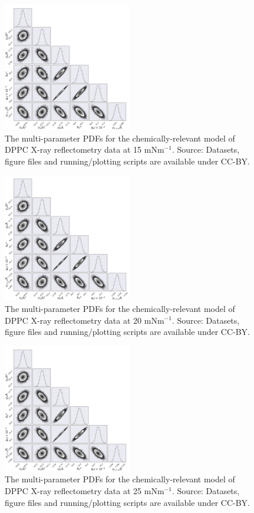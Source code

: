 \documentclass[11pt,a4paper]{article}
\begin{document}
\begin{figure}[h]
	\centering
	\includegraphics[width=0.50\textwidth]{figures/dppc2_all_corner}
	\caption{The multi-parameter PDFs for the chemically-relevant model of DPPC X-ray reflectometry data at 15 mNm$^{-1}$. Source: Datasets, figure files and running/plotting scripts are available under CC-BY.\cite{mccluskey_2018}}
	\label{fig:dppc2}
\end{figure}
\begin{figure}[h]
	\centering
	\includegraphics[width=0.50\textwidth]{figures/dppc3_all_corner}
	\caption{The multi-parameter PDFs for the chemically-relevant model of DPPC X-ray reflectometry data at 20 mNm$^{-1}$. Source: Datasets, figure files and running/plotting scripts are available under CC-BY.\cite{mccluskey_2018}}
	\label{fig:dppc3}
\end{figure}
\begin{figure}[h]
	\centering
	\includegraphics[width=0.50\textwidth]{figures/dppc4_all_corner}
	\caption{The multi-parameter PDFs for the chemically-relevant model of DPPC X-ray reflectometry data at 25 mNm$^{-1}$. Source: Datasets, figure files and running/plotting scripts are available under CC-BY.\cite{mccluskey_2018}}
	\label{fig:dppc4}
\end{figure}
\end{document}

